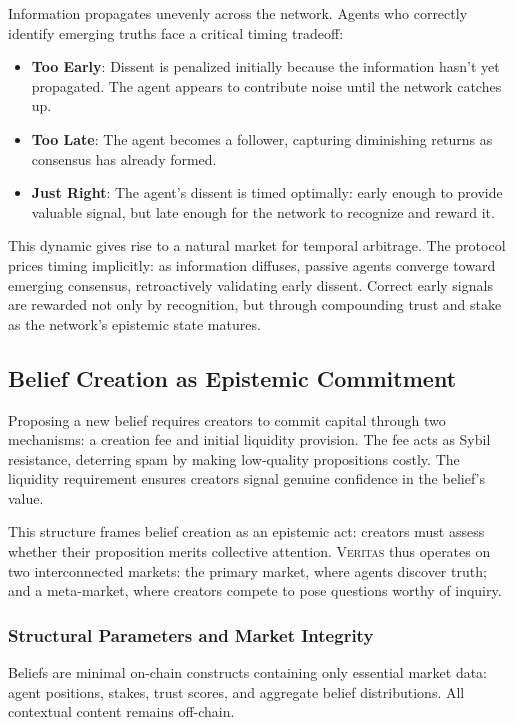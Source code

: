 \documentclass[11pt,a4paper]{article}
\newcommand{\veritas}{\textsc{Veritas}}
\begin{document}
Information propagates unevenly across the network. Agents who correctly identify emerging truths face a critical timing tradeoff:

\begin{itemize}
\item \textbf{Too Early}: Dissent is penalized initially because the information hasn't yet propagated. The agent appears to contribute noise until the network catches up.
\item \textbf{Too Late}: The agent becomes a follower, capturing diminishing returns as consensus has already formed.
\item \textbf{Just Right}: The agent's dissent is timed optimally: early enough to provide valuable signal, but late enough for the network to recognize and reward it.
\end{itemize}

This dynamic gives rise to a natural market for temporal arbitrage. The protocol prices timing implicitly: as information diffuses, passive agents converge toward emerging consensus, retroactively validating early dissent. Correct early signals are rewarded not only by recognition, but through compounding trust and stake as the network's epistemic state matures.

\subsection{Belief Creation as Epistemic Commitment}

Proposing a new belief requires creators to commit capital through two mechanisms: a creation fee and initial liquidity provision. The fee acts as Sybil resistance, deterring spam by making low-quality propositions costly. The liquidity requirement ensures creators signal genuine confidence in the belief's value.

This structure frames belief creation as an epistemic act: creators must assess whether their proposition merits collective attention. \veritas{} thus operates on two interconnected markets: the primary market, where agents discover truth; and a meta-market, where creators compete to pose questions worthy of inquiry.

\subsubsection{Structural Parameters and Market Integrity}

Beliefs are minimal on-chain constructs containing only essential market data: agent positions, stakes, trust scores, and aggregate belief distributions. All contextual content remains off-chain.
\end{document}
